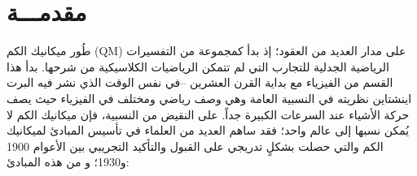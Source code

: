 \chapter*{مقدمـــة} %
\label{Chapter0} 
\renewcommand{\theequation}{\arabic{chapter}.\arabic{equation}}

\newcommand{\keyword}[1]{\textbf{#1}}
\newcommand{\tabhead}[1]{\textbf{#1}}
\newcommand{\code}[1]{\texttt{#1}}


طُور ميكانيك الكم (QM) على مدار العديد من العقود؛ إذ بدأ كمجموعة من التفسيرات الرياضية الجدلية للتجارب التي لم تتمكن الرياضيات الكلاسيكية من شرحها. بدأ هذا القسم من الفيزياء مع بداية القرن العشرين –في نفس الوقت الذي نشر فيه البرت اينشتاين نظريته في النسبية العامة وهي وصف رياضي ومختلف في الفيزياء حيث يصف حركة الأشياء عند السرعات الكبيرة جداً. على النقيض من النسبية، فإن ميكانيك الكم لا يُمكن نسبها إلى عالم واحد؛ فقد ساهم العديد من العلماء في تأسيس المبادئ لميكانيك الكم والتي حصلت بشكلٍ تدريجي على القبول والتأكيد التجريبي بين الأعوام 1900 و1930؛ و من هذه المبادئ:
